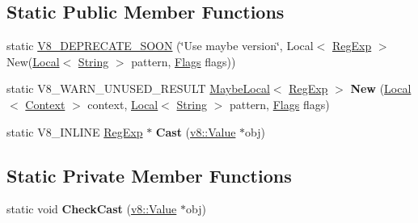 \subsection*{Static Public Member Functions}
\begin{DoxyCompactItemize}
\item 
static \hyperlink{classv8_1_1_reg_exp_a9793a5a1e31b5ea0563d96d8c74c01ff}{V8\+\_\+\+D\+E\+P\+R\+E\+C\+A\+T\+E\+\_\+\+S\+O\+ON} (\char`\"{}Use maybe version\char`\"{}, Local$<$ \hyperlink{classv8_1_1_reg_exp}{Reg\+Exp} $>$ New(\hyperlink{classv8_1_1_local}{Local}$<$ \hyperlink{classv8_1_1_string}{String} $>$ pattern,                                                                                                                                                                           \hyperlink{classv8_1_1_reg_exp_aa4718a5c1f18472aff3bf51ed694fc5a}{Flags} flags))
\item 
static V8\+\_\+\+W\+A\+R\+N\+\_\+\+U\+N\+U\+S\+E\+D\+\_\+\+R\+E\+S\+U\+LT \hyperlink{classv8_1_1_maybe_local}{Maybe\+Local}$<$ \hyperlink{classv8_1_1_reg_exp}{Reg\+Exp} $>$ {\bfseries New} (\hyperlink{classv8_1_1_local}{Local}$<$ \hyperlink{classv8_1_1_context}{Context} $>$ context, \hyperlink{classv8_1_1_local}{Local}$<$ \hyperlink{classv8_1_1_string}{String} $>$ pattern, \hyperlink{classv8_1_1_reg_exp_aa4718a5c1f18472aff3bf51ed694fc5a}{Flags} flags)\hypertarget{classv8_1_1_reg_exp_af741ed08aa911e9f2f95db8575cb2b00}{}\label{classv8_1_1_reg_exp_af741ed08aa911e9f2f95db8575cb2b00}

\item 
static V8\+\_\+\+I\+N\+L\+I\+NE \hyperlink{classv8_1_1_reg_exp}{Reg\+Exp} $\ast$ {\bfseries Cast} (\hyperlink{classv8_1_1_value}{v8\+::\+Value} $\ast$obj)\hypertarget{classv8_1_1_reg_exp_ac06d8f61c0ebb2e7292e6aeff7108f26}{}\label{classv8_1_1_reg_exp_ac06d8f61c0ebb2e7292e6aeff7108f26}

\end{DoxyCompactItemize}
\subsection*{Static Private Member Functions}
\begin{DoxyCompactItemize}
\item 
static void {\bfseries Check\+Cast} (\hyperlink{classv8_1_1_value}{v8\+::\+Value} $\ast$obj)\hypertarget{classv8_1_1_reg_exp_a596e4c9a8faee104567cd76291d5a4dc}{}\label{classv8_1_1_reg_exp_a596e4c9a8faee104567cd76291d5a4dc}

\end{DoxyCompactItemize}



